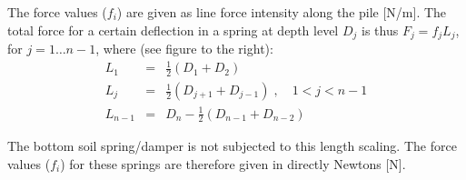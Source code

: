 \label{soil-springs}{}
\noindent\begin{minipage}{0.6\textwidth}\raggedright
The force values ($f_i$) are given as line force intensity along the pile [N/m].
The total force for a certain deflection in a spring at depth level $D_j$
is thus $F_j=f_jL_j$, for $j=1\ldots n-1$, where (see figure to the right):
%
\begin{eqnarray*}
L_1 &=& \frac{1}{2}(D_1 + D_2) \\
L_j &=& \frac{1}{2}(D_{j+1} + D_{j-1})\;,\quad 1<j<n-1 \\
L_{n-1} &=& D_n -\frac{1}{2}(D_{n-1} + D_{n-2})
\end{eqnarray*}

The bottom soil spring/damper is not subjected to this length scaling.
The force values ($f_i$) for these springs are therefore \newline
given in directly Newtons [N].\baselineskip\mbox{}
\end{minipage}\begin{minipage}{0.4\textwidth}

\end{minipage}
